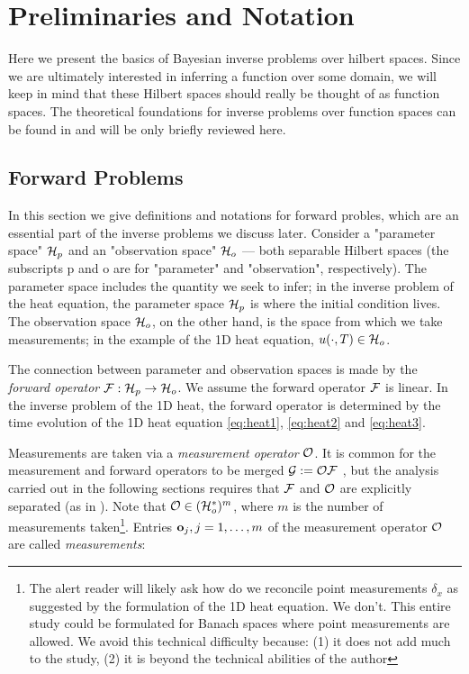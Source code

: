 \section{Preliminaries and Notation}\label{section:prelim}
Here we present the basics of Bayesian inverse problems over hilbert
spaces. Since we are ultimately interested in inferring a function over some
domain, we will keep in mind that these Hilbert spaces should really
be thought of as function spaces. The theoretical foundations for
inverse problems over function spaces can be found in \cite{Stuart10}
and will be only briefly reviewed here.


\subsection{Forward Problems}\label{subsec:abstract OED}
In this section we give definitions and notations for forward probles,
which are an essential part of the inverse problems we discuss
later. Consider a "parameter space" \(\mathcal{H}_p\) and an "observation
space" \(\mathcal{H}_o\) --- both separable Hilbert spaces (the subscripts p
and o are for "parameter" and "observation", respectively). The
parameter space includes the quantity we seek to infer; in the inverse
problem of the heat equation, the parameter space $\mathcal{H}_p$ is where the
initial condition lives. The observation space $\mathcal{H}_o$, on the other
hand, is the space from which we take measurements; in the example of
the 1D heat equation, $u(\cdot, T) \in \mathcal{H}_o$.

The connection between parameter and observation spaces is made by the
\emph{forward operator} \(\mathcal{F}: \mathcal{H}_p \to \mathcal{H}_o\). We assume the
forward operator \(\mathcal{F}\) is linear. In the inverse problem of the 1D
heat, the forward operator is determined by the time evolution of the
1D heat equation \eqref{eq:heat1}, \eqref{eq:heat2} and
\eqref{eq:heat3}.

Measurements are taken via a \emph{measurement operator} \(\mathcal{O}\). It
is common for the measurement and forward operators to be merged
\(\mathcal{G} := \mathcal{O} \mathcal{F}\) \cite{AlexanderianGloorGhattas14}, but the
analysis carried out in the following sections requires that \(\mathcal{F}\)
and \(\mathcal{O}\) are explicitly separated (as in
\cite{attia2022stochastic, cvetkovic2023choosing}). Note that \(\mathcal{O}
\in ( \mathcal{H}_o^* )^m\), where \(m\) is the number of measurements
taken\footnote{The alert reader will likely ask how do we reconcile
point measurements $\delta_x$ as suggested by the formulation of the
1D heat equation. We don't. This entire study could be formulated for
Banach spaces where point measurements are allowed. We avoid this
technical difficulty because: (1) it does not add much to the study,
(2) it is beyond the technical abilities of the author}. Entries
\(\mathbf{o}_j, j=1,\dots,m\) of the measurement operator \(\mathcal{O}\) are
called \emph{measurements}:

